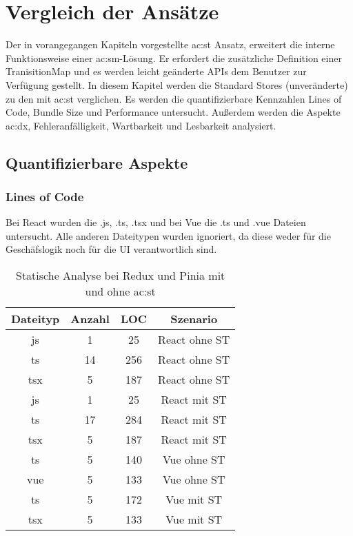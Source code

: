 \chapter{Vergleich der Ansätze} \label{vergleich}

Der in vorangegangen Kapiteln vorgestellte \acrlong{ac:st} Ansatz, erweitert die interne Funktionsweise einer \acrlong{ac:sm}-Lösung. Er erfordert die zusätzliche Definition einer TranisitionMap und es werden leicht geänderte APIs dem Benutzer zur Verfügung gestellt. In diesem Kapitel werden die Standard Stores (unveränderte) zu den mit \acrlong{ac:st} verglichen. Es werden die quantifizierbare Kennzahlen Lines of Code, Bundle Size und Performance untersucht. Außerdem werden die Aspekte \acrlong{ac:dx}, Fehleranfälligkeit, Wartbarkeit und Lesbarkeit analysiert.

\section{Quantifizierbare Aspekte}
\subsection{Lines of Code}

Bei React wurden die .js, .ts, .tsx und bei Vue die .ts und .vue Dateien untersucht. Alle anderen Dateitypen wurden ignoriert, da diese weder für die Geschäfslogik noch für die UI verantwortlich sind.

\begin{table}[!ht]
  \caption{Statische Analyse bei Redux und Pinia mit und ohne \acrshort{ac:st}}
  \label{tab:staticAnalysisSTvsNoST}

  \begin{center}
    \begin{tabular}{|c|c|c|c|} 
    \hline
    Dateityp & Anzahl & LOC & Szenario \\ [0.5ex] 
    \hline\hline
    js & 1 & 25 & React ohne ST \\ 
    \hline
    ts & 14 & 256 & React ohne ST \\
    \hline
    tsx & 5 & 187 & React ohne ST \\
    \hline\hline
    js & 1 & 25 & React mit ST \\ 
    \hline
    ts & 17 & 284 & React mit ST \\
    \hline
    tsx & 5 & 187 & React mit ST \\
    \hline\hline
    ts & 5 & 140 & Vue ohne ST \\
    \hline
    vue & 5 & 133 & Vue ohne ST \\
    \hline\hline
    ts & 5 & 172 & Vue mit ST \\
    \hline
    tsx & 5 & 133 & Vue mit ST \\
    \hline
    \end{tabular}
  \end{center}
\end{table}

